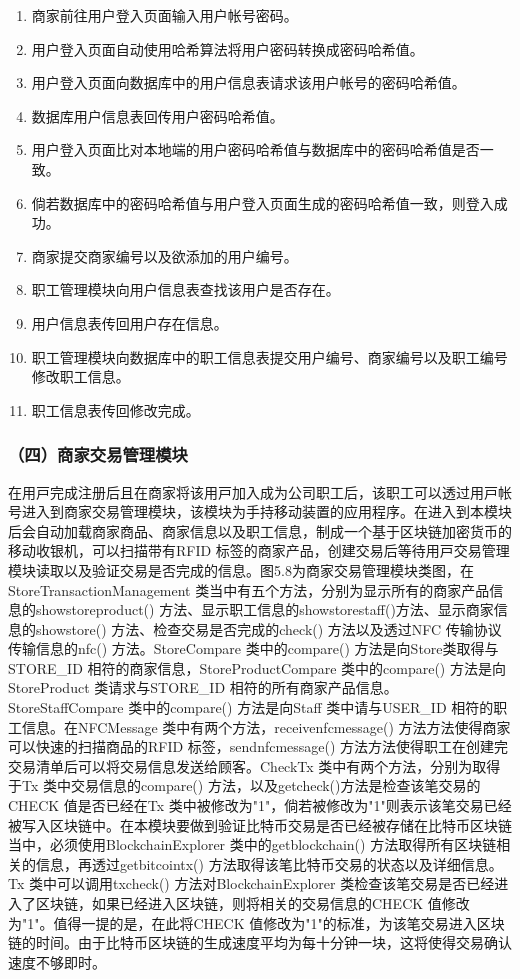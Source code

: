 	\begin{enumerate}
	\item 商家前往用户登入页面输入用户帐号密码。
	\item 用户登入页面自动使用哈希算法将用户密码转换成密码哈希值。
	\item 用户登入页面向数据库中的用户信息表请求该用户帐号的密码哈希值。
	\item 数据库用户信息表回传用户密码哈希值。
	\item 用户登入页面比对本地端的用户密码哈希值与数据库中的密码哈希值是否一致。
	\item 倘若数据库中的密码哈希值与用户登入页面生成的密码哈希值一致，则登入成功。
	\item 商家提交商家编号以及欲添加的用户编号。
	\item 职工管理模块向用户信息表查找该用户是否存在。
	\item 用户信息表传回用户存在信息。
	\item 职工管理模块向数据库中的职工信息表提交用户编号、商家编号以及职工编号修改职工信息。
	\item 职工信息表传回修改完成。
	\end{enumerate}

\subsubsection{（四）商家交易管理模块}
在⽤⼾完成注册后且在商家将该⽤⼾加⼊成为公司职⼯后，该职⼯可以透过⽤⼾帐号进⼊到商家交易管理模块，该模块为手持移动装置的应⽤程序。在进⼊到本模块后会⾃动加载商家商品、商家信息以及职⼯信息，制成⼀个基于区块链加密货币的移动收银机，可以扫描带有RFID 标签的商家产品，创建交易后等待⽤⼾交易管理模块读取以及验证交易是否完成的信息。图5.8为商家交易管理模块类图，在StoreTransactionManagement 类当中有五个⽅法，分别为显⽰所有的商家产品信息的showstoreproduct() ⽅法、显⽰职⼯信息的showstorestaff()⽅法、显⽰商家信息的showstore() ⽅法、检查交易是否完成的check() ⽅法以及透过NFC 传输协议传输信息的nfc() ⽅法。StoreCompare 类中的compare() ⽅法是向Store类取得与STORE\_ID 相符的商家信息，StoreProductCompare 类中的compare() ⽅法是向StoreProduct 类请求与STORE\_ID 相符的所有商家产品信息。StoreStaffCompare 类中的compare() ⽅法是向Staff 类中请与USER\_ID 相符的职⼯信息。在NFCMessage 类中有两个⽅法，receivenfcmessage() 方法⽅法使得商家可以快速的扫描商品的RFID 标签，sendnfcmessage() 方法⽅法使得职⼯在创建完交易清单后可以将交易信息发送给顾客。CheckTx 类中有两个⽅法，分别为取得于Tx 类中交易信息的compare() ⽅法，以及getcheck()⽅法是检查该笔交易的CHECK 值是否已经在Tx 类中被修改为"1"，倘若被修改为"1"则表示该笔交易已经被写⼊区块链中。在本模块要做到验证⽐特币交易是否已经被存储在⽐特币区块链当中，必须使⽤BlockchainExplorer 类中的getblockchain() ⽅法取得所有区块链相关的信息，再透过getbitcointx() ⽅法取得该笔⽐特币交易的状态以及详细信息。Tx 类中可以调⽤txcheck() ⽅法对BlockchainExplorer 类检查该笔交易是否已经进⼊了区块链，如果已经进⼊区块链，则将相关的交易信息的CHECK 值修改为"1"。值得⼀提的是，在此将CHECK 值修改为"1"的标准，为该笔交易进⼊区块链的时间。由于⽐特币区块链的⽣成速度平均为每⼗分钟⼀块，这将使得交易确认速度不够即时。


